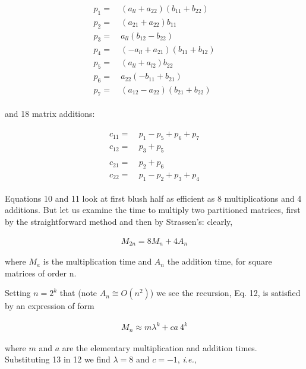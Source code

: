\begin{align}
\begin{split}
    p_{1} =&\ (a_{ll} + a_{22}) (b_{11} + b_{22})  \\
    p_{2} =&\ (a_{21} + a_{22}) b_{11}             \\
    p_{3} =&\ a_{ll} (b_{12} - b_{22})             \\
    p_{4} =&\ (-a_{ll} + a_{21}) (b_{11} + b_{12}) \\
    p_{5} =&\ (a_{ll} + a_{l2}) b_{22}             \\
    p_{6} =&\ a_{22} (-b_{11} + b_{21})            \\
    p_{7} =&\ (a_{12} - a_{22}) (b_{21} + b_{22})  
\end{split}
\end{align}

and 18 matrix additions:

\begin{align}
\begin{split}
    c_{11} =&\ p_{1} - p_{5} + p_{6} + p_{7}    \\
    c_{12} =&\ p_{3} + p_{5}                    \\
                                                \\
    c_{21} =&\ p_{2} + p_{6}                    \\
    c_{22} =&\ p_{1} - p_{2} + p_{3} + p_{4}
\end{split}
\end{align}

Equations 10 and 11 look at first blush half as efficient as 8 multiplications and 4 additions. But let us examine the time to multiply two partitioned matrices, first by the straightforward method and then by Strassen's: clearly,

\begin{align}
    M_{2n} = 8M_{n} + 4A_{n}
\end{align}

where $M_{a}$ is the multiplication time and $A_{n}$ the addition time, for square matrices of order n.

Setting $n = 2^{k}$ that (note $A_{n} \cong O(n^{2})$) we see the recursion, Eq. 12, is satisfied by an expression of form

\begin{align}
    M_{n} \approx m\lambda^{k} + ca\ 4^{k}
\end{align}

where $m$ and $a$ are the elementary multiplication and addition times. Substituting 13 in 12 we find $\lambda = 8$ and $c = -1$, \textit{i.e.},


